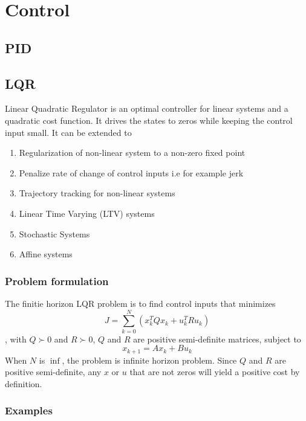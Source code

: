 \chapter{Control}
\section{PID}
\section{LQR}
Linear Quadratic Regulator is an optimal controller for linear systems and a quadratic cost function. It drives the states to zeros while keeping the control input small. It can be extended to
\begin{enumerate}[topsep=0pt,itemsep=2pt,parsep=0pt,partopsep=0pt]
    \item Regularization of non-linear system to a non-zero fixed point
    \item Penalize rate of change of control inputs i.e for example jerk
    \item Trajectory tracking for non-linear systems
    \item Linear Time Varying (LTV) systems
    \item Stochastic Systems
    \item Affine systems
\end{enumerate}
\subsection{Problem formulation}
The finitie horizon LQR problem is to find control inputs that minimizes 
$$J=\sum_{k=0}^N(x_k^TQx_k + u_k^TRu_k)$$, with $Q\succ0$ and $R\succ0$, $Q$ and $R$ are positive semi-definite matrices, subject to 
$$x_{k+1}=Ax_{k}+Bu_{k}$$
When $N$ is $\inf$, the problem is infinite horizon problem.
Since $Q$ and $R$ are positive semi-definite, any $x$ or $u$ that are not zeros will yield a positive cost by definition.
\subsection{Examples}
